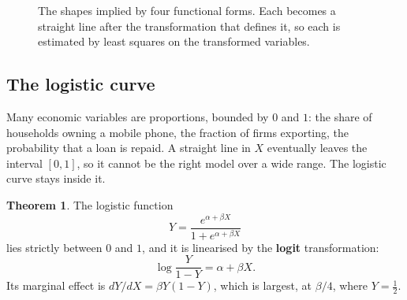 \documentclass[11pt,a4paper]{article}
\numberwithin{equation}{section}
\theoremstyle{definition}
\newtheorem{thm}{Theorem}[subsection]
\begin{document}
\begin{figure}[H]
\caption{The shapes implied by four functional forms. Each becomes a straight line after the transformation that defines it, so each is
estimated by least squares on the transformed variables.}
\label{fig:forms}
\end{figure}

\subsection{The logistic curve}
\label{ssec:logistic}

Many economic variables are proportions, bounded by $0$ and $1$: the share of households owning a mobile phone, the fraction of firms
exporting, the probability that a loan is repaid. A straight line in $X$ eventually leaves the interval $[0, 1]$, so it cannot be the right model
over a wide range. The logistic curve stays inside it.

\begin{thm}
\label{thm:logit}
The logistic function
\[
Y = \frac{e^{\alpha + \beta X}}{1 + e^{\alpha + \beta X}}
\]
lies strictly between $0$ and $1$, and it is linearised by the \textbf{logit} transformation:
\[
\log\frac{Y}{1 - Y} = \alpha + \beta X .
\]
Its marginal effect is $dY/dX = \beta Y(1 - Y)$, which is largest, at $\beta/4$, where $Y = \frac12$.
\end{thm}
\end{document}
